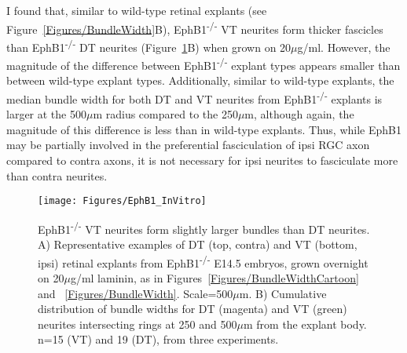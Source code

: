 I found that, similar to wild-type retinal explants (see Figure~\ref{Figures/BundleWidth}B), EphB1\textsuperscript{-/-} VT neurites form thicker fascicles than EphB1\textsuperscript{-/-} DT neurites (Figure~\ref{EphB1InVitro}B) when grown on 20$\mu$g/ml.
However, the magnitude of the difference between EphB1\textsuperscript{-/-} explant types appears smaller than between wild-type explant types. 
Additionally, similar to wild-type explants, the median bundle width for both DT and VT neurites from EphB1\textsuperscript{-/-} explants is larger at the 500$\mu$m radius compared to the 250$\mu$m, although again, the magnitude of this difference is less than in wild-type explants.
Thus, while EphB1 may be partially involved in the preferential fasciculation of ipsi RGC axon compared to contra axons, it is not necessary for ipsi neurites to fasciculate more than contra neurites.
\begin{figure}[hbtp]
    \begin{center}
        \texttt{[image: Figures/EphB1\_InVitro]}
        \caption[EphB1\textsuperscript{-/-} VT neurites form slightly larger bundles than DT neurites.]
        {EphB1\textsuperscript{-/-} VT neurites form slightly larger bundles than DT neurites.
        A) Representative examples of DT (top, contra) and VT (bottom, ipsi) retinal explants from EphB1\textsuperscript{-/-} E14.5 embryos, grown overnight on 20$\mu$g/ml laminin, as in Figures~\ref{Figures/BundleWidthCartoon} and ~\ref{Figures/BundleWidth}.
        Scale=500$\mu$m.
        B) Cumulative distribution of bundle widths for DT (magenta) and VT (green) neurites intersecting rings at 250 and 500$\mu$m from the explant body.
        n=15 (VT) and 19 (DT), from three experiments.
        }
        \label{EphB1InVitro}
    \end{center}
\end{figure}
